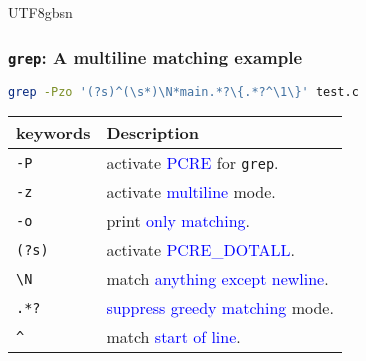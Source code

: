 \documentclass[red]{beamer}
\newcommand*{\lstverb}{\lstinline[style=caret]}
\begin{document}
\begin{CJK*}{UTF8}{gbsn}
\begin{frame}
\frametitle{\texttt{grep}: A multiline matching example}
\begin{block}{}
\begin{lstlisting}[language=bash,basicstyle=\ttfamily\footnotesize]
grep -Pzo '(?s)^(\s*)\N*main.*?\{.*?^\1\}' test.c
\end{lstlisting}
\end{block}
\begin{table}[ht]
\footnotesize
\renewcommand\arraystretch{1.5}
\begin{tabular}{ll}
\hline
\textbf{keywords} & \textbf{Description}\\
\hline
\texttt{-P} & activate \textcolor{blue}{PCRE} for \texttt{grep}.\\
\texttt{-z} & activate \textcolor{blue}{multiline} mode.\\
\texttt{-o} & print \textcolor{blue}{only matching}.\\
\texttt{(?s)} & activate \textcolor{blue}{PCRE\_DOTALL}.\\
\texttt{\textbackslash N} & match \textcolor{blue}{anything except newline}.\\
\texttt{.*?} & \textcolor{blue}{suppress greedy matching} mode.\\
\lstverb|^| & match \textcolor{blue}{start of line}.\\
\hline
\end{tabular}
\end{table}
\end{frame}


\end{CJK*}
\end{document}

